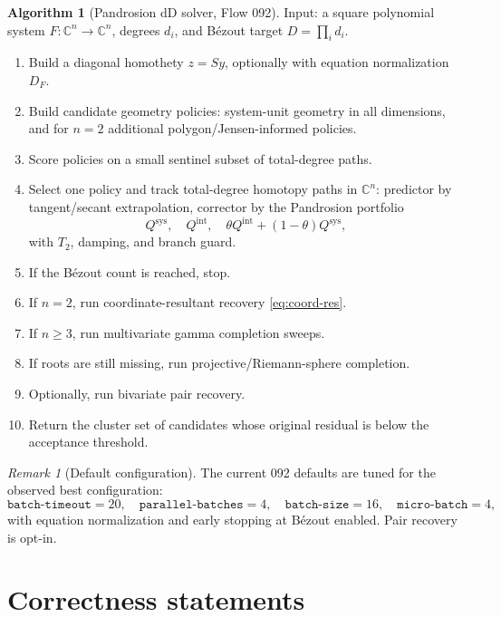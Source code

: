 \documentclass[11pt,a4paper]{article}
\theoremstyle{definition}
\newtheorem{algorithm}[definition]{Algorithm}
\theoremstyle{plain}
\theoremstyle{remark}
\newtheorem{remark}[definition]{Remark}
\newcommand{\C}{\mathbb C}
\begin{document}
\begin{algorithm}[Pandrosion dD solver, Flow 092]
Input: a square polynomial system \(F:\C^n\to\C^n\), degrees \(d_i\), and
B\'ezout target \(D=\prod_i d_i\).

\begin{enumerate}[leftmargin=2em]
  \item Build a diagonal homothety \(z=Sy\), optionally with equation
  normalization \(D_F\).
  \item Build candidate geometry policies:
  system-unit geometry in all dimensions, and for \(n=2\) additional
  polygon/Jensen-informed policies.
  \item Score policies on a small sentinel subset of total-degree paths.
  \item Select one policy and track total-degree homotopy paths in \(\C^n\):
  predictor by tangent/secant extrapolation, corrector by the Pandrosion
  portfolio
  \[
    Q^{\mathrm{sys}},\quad Q^{\mathrm{int}},\quad
    \theta Q^{\mathrm{int}}+(1-\theta)Q^{\mathrm{sys}},
  \]
  with \(T_2\), damping, and branch guard.
  \item If the B\'ezout count is reached, stop.
  \item If \(n=2\), run coordinate-resultant recovery
  \eqref{eq:coord-res}.
  \item If \(n\ge3\), run multivariate gamma completion sweeps.
  \item If roots are still missing, run projective/Riemann-sphere completion.
  \item Optionally, run bivariate pair recovery.
  \item Return the cluster set of candidates whose original residual is below
  the acceptance threshold.
\end{enumerate}
\end{algorithm}

\begin{remark}[Default configuration]
The current 092 defaults are tuned for the observed best configuration:
\[
  \texttt{batch-timeout}=20,\quad
  \texttt{parallel-batches}=4,\quad
  \texttt{batch-size}=16,\quad
  \texttt{micro-batch}=4,
\]
with equation normalization and early stopping at B\'ezout enabled.  Pair
recovery is opt-in.
\end{remark}

\section{Correctness statements}
\end{document}

